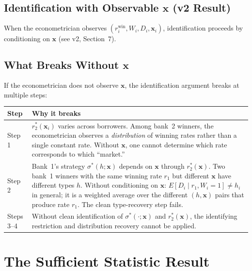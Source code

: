 \documentclass[12pt]{article}
\theoremstyle{plain}
\theoremstyle{plain}
\theoremstyle{definition}  %
\theoremstyle{remark}  %
\begin{document}
\subsection{Identification with Observable $\mathbf{x}$ (v2 Result)}

When the econometrician observes $(r_i^{\text{win}}, W_i, D_i, \mathbf{x}_i)$, identification proceeds by conditioning on $\mathbf{x}$ (see v2, Section~7). 

\subsection{What Breaks Without $\mathbf{x}$}\label{sec:breaks}

If the econometrician does not observe $\mathbf{x}$, the identification argument breaks at multiple steps:

\begin{center}
\renewcommand{\arraystretch}{1.4}
\begin{tabular}{p{1.5cm}p{12.5cm}}
\toprule
\textbf{Step} & \textbf{Why it breaks} \\
\midrule
Step 1 & $r_2^*(\mathbf{x}_i)$ varies across borrowers. Among bank~2 winners, the econometrician observes a \emph{distribution} of winning rates rather than a single constant rate. Without $\mathbf{x}$, one cannot determine which rate corresponds to which ``market.'' \\[4pt]
Step 2 & Bank~1's strategy $\sigma^*(h; \mathbf{x})$ depends on $\mathbf{x}$ through $r_2^*(\mathbf{x})$. Two bank~1 winners with the same winning rate $r_1$ but different $\mathbf{x}$ have different types $h$. Without conditioning on $\mathbf{x}$: $E[D_i \mid r_1, W_i = 1] \neq h_i$ in general; it is a weighted average over the different $(h, \mathbf{x})$ pairs that produce rate $r_1$. The clean type-recovery step fails. \\[4pt]
Steps 3--4 & Without clean identification of $\sigma^*(\cdot; \mathbf{x})$ and $r_2^*(\mathbf{x})$, the identifying restriction and distribution recovery cannot be applied. \\
\bottomrule
\end{tabular}
\end{center}



\newpage
\section{The Sufficient Statistic Result}\label{sec:suffstat}
\end{document}
